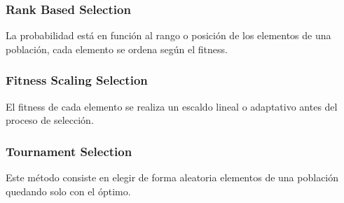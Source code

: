 \documentclass[12pt]{article}
\begin{document}
                \subsubsection[Rank Based Selection]{Rank Based Selection}
                    La probabilidad está en función al rango o posición de los elementos de una población, cada elemento se ordena según el fitness.
                
                \subsubsection[Fitness Scaling Selection]{Fitness Scaling Selection}
                    El fitness de cada elemento se realiza un escaldo lineal o adaptativo antes del proceso de selección.

                \subsubsection[Tournament Selection]{Tournament Selection}
                    Este método consiste en elegir de forma aleatoria elementos de una población quedando solo con el óptimo.
                \vspace{3mm}
                
\end{document}
